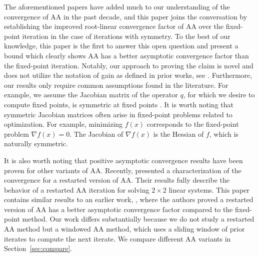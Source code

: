 \documentclass[11pt]{article}
\begin{document}
The aforementioned papers have added much to our understanding of the convergence of AA in the past decade, and this paper joins the conversation by establishing the improved root-linear convergence factor of AA over the fixed-point iteration {\color{black} in the case of iterations with symmetry}. To the best of our knowledge, this paper is the first to answer this open question and present a bound which clearly shows AA has a better asymptotic convergence factor than the fixed-point iteration.
Notably, our approach to proving  the claim is novel and does not utilize the notation of gain as defined in prior works, see \cite{Evans2020,pollock2019anderson,pollock2021anderson}.
Furthermore, our results only require common assumptions found in the literature. For example, we assume the Jacobian matrix of the operator ${q}$, for which we desire to compute fixed points, is symmetric at fixed points \citep{scieur2019generalized,NIPS2016_bbf94b34}.   
{\color{black} It is worth noting that symmetric Jacobian matrices often arise in fixed-point problems related to optimization. For example, minimizing $f(x)$  corresponds to the fixed-point problem $\nabla f(x)=0$. The Jacobian of $\nabla f(x)$ is the Hessian of $f$, which is naturally symmetric.}

It is also worth noting that positive asymptotic convergence results have been proven for other variants of AA. Recently, \cite{DeSterck2024} presented a characterization of the convergence for a restarted version of AA. 
Their results fully describe the behavior of a restarted AA iteration for solving $2\times 2$ linear systems. 
This paper contains similar results to an earlier work, \citep{Both2019}, where the authors proved a restarted version of AA has a better asymptotic convergence factor compared to the fixed-point method. 
Our work differs substantially because we do not study a restarted AA method but a windowed AA method, which uses a sliding window of prior iterates to compute the next iterate. We compare different AA variants in Section~\ref{sec:compare}.
\end{document}
